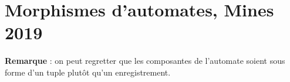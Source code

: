 
\usepackage{enumitem}
\def\numero{Révisions 1}
\def\classe{Option info MP1}
\renewcommand*{\arraystretch}{1.2}
\usetikzlibrary[automata]

\camltrue

\chapter{Morphismes d'automates, Mines 2019}
{\bf Remarque} : on peut regretter que les composantes de l'automate soient sous forme d'un tuple plutôt qu'un enregistrement.

